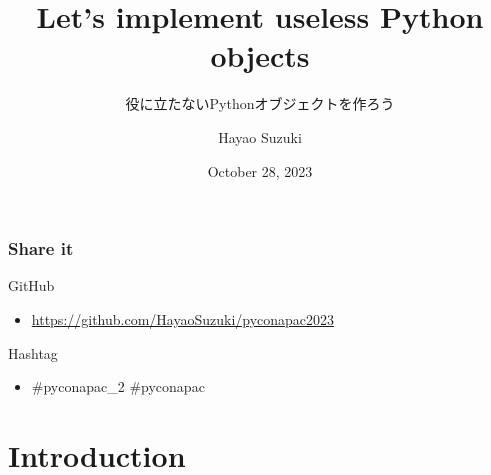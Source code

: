 \documentclass[aspectratio=169,dvipdfmx,12pt,notheorems]{beamer}
\title{Let's implement useless Python objects}
\subtitle{役に立たないPythonオブジェクトを作ろう}
\author[Hayao]{Hayao Suzuki}
\institute[PyCon APAC 2023]{PyCon APAC 2023}
\date{October 28, 2023}
\theoremstyle{definition}
\begin{document}
\begin{frame}[plain]\frametitle{}
\titlepage %
\end{frame}

\begin{frame}\frametitle{Share it}

\begin{block}{GitHub}
\begin{itemize}
\item \url{https://github.com/HayaoSuzuki/pyconapac2023}
\end{itemize}
\end{block}

\begin{block}{Hashtag}
\begin{itemize}
\item \#pyconapac\_2 \#pyconapac
\end{itemize}
\end{block}

\end{frame}

\section{Introduction}
\end{document}
